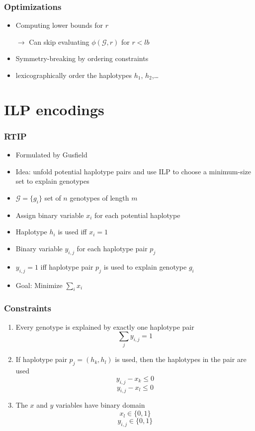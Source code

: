 \documentclass[handout]{beamer}
\begin{document}
\begin{frame}
\frametitle{Optimizations}
\begin{itemize}
\item Computing lower bounds for $r$
\item[$\rightarrow$] Can skip evaluating $\phi (\mathcal{G}, r)$ for $r < lb$
\item Symmetry-breaking by ordering constraints
\item lexicographically order the haplotypes $h_1$, $h_2$,\dots
\end{itemize}
\end{frame}

\section{ILP encodings}

\begin{frame}
\frametitle{RTIP}
\begin{itemize}
\item Formulated by Gusfield~\cite{DBLP:conf/cpm/Gusfield03}
\item Idea: unfold potential haplotype pairs and use ILP to choose a minimum-size set to explain genotypes
\item $\mathcal{G} = \{g_i\}$ set of $n$ genotypes of length $m$
\item Assign binary variable $x_i$ for each potential haplotype
\item Haplotype $h_i$ is used iff $x_i = 1$
\item Binary variable $y_{i,j}$ for each haplotype pair $p_j$
\item $y_{i,j} = 1$ iff haplotype pair $p_j$ is used to explain genotype $g_i$ 
\item Goal: Minimize $\displaystyle \sum_i x_i$
\end{itemize}
\end{frame}

\begin{frame}
\frametitle{Constraints}
\begin{enumerate}
\item Every genotype is explained by exactly one haplotype pair
$$ \sum_{j} y_{i,j} = 1 $$
\item If haplotype pair $p_j=(h_k, h_l)$ is used, then the haplotypes in the pair are used
$$ y_{i,j} - x_k \leq 0 $$
$$ y_{i,j} - x_l \leq 0 $$
\item The $x$ and $y$ variables have binary domain
$$ x_l\in \{0, 1\} $$
$$ y_{i,j}\in \{0, 1\} $$
\end{enumerate}
\end{frame}
\end{document}
